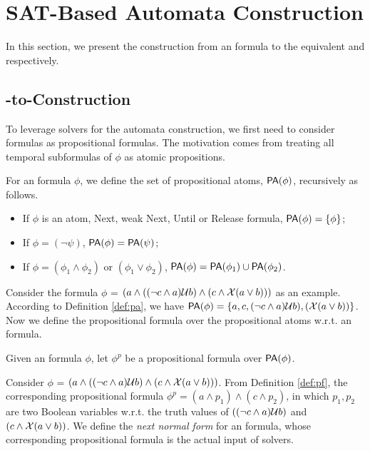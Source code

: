 \section{SAT-Based Automata Construction}\label{sec:main}

In this section, we present the construction from an \ltlf formula to the equivalent \NFA and \DFA respectively. 


\subsection{\ltlf-to-\NFA Construction}

To leverage \SAT solvers for the automata construction, we first need to consider \ltlf formulas as propositional formulas. The motivation comes from treating all temporal subformulas of $\phi$ as atomic propositions. 

\begin{definition}\label{def:pa}
For an \ltlf formula $\phi$, we define the set of propositional atoms, ${\sf PA}(\phi)$, recursively as follows.
\begin{itemize}
	\item If $\phi$ is an atom, Next, weak Next, Until or Release formula, ${\sf PA}(\phi)=\{\phi\}$;
	\item If $\phi = (\neg \psi)$, ${\sf PA}(\phi)= {\sf PA}(\psi)$;
	\item If $\phi = (\phi_1 \wedge \phi_2)$ or $(\phi_1 \vee \phi_2)$, ${\sf PA}(\phi) = {\sf PA}(\phi_1) \cup {\sf PA}(\phi_2)$.
\end{itemize}
\end{definition}

Consider the formula $\phi$ = $(a \wedge ((\neg c \wedge a)\mathcal{U} b) \wedge (c \wedge \mathcal{X} (a \vee b)))$ as an example. According to Definition \ref{def:pa}, we have ${\sf PA}(\phi)=\{a, c, (\neg c \wedge a)\mathcal{U} b), (\mathcal{X} (a \vee b))\}$. Now we define the propositional formula over the propositional atoms w.r.t. an \ltlf formula.

\begin{definition}\label{def:pf}
Given an \ltlf formula $\phi$, let $\phi^{p}$ be a propositional formula over ${\sf PA}(\phi)$. 
\end{definition}

Consider $\phi$ = $(a \wedge ((\neg c \wedge a)\mathcal{U} b) \wedge (c \wedge \mathcal{X} (a \vee b)))$. From Definition \ref{def:pf}, the corresponding propositional formula $\phi^p = (a \wedge p_1) \wedge (c \wedge p_2)$, in which $p_1, p_2$ are two Boolean variables w.r.t. the truth values of $((\neg c \wedge a)\mathcal{U} b)$ and $(c \wedge \mathcal{X} (a \vee b))$. We define the \emph{next normal form} for an \ltlf formula, whose corresponding propositional formula is the actual input of \SAT solvers.

